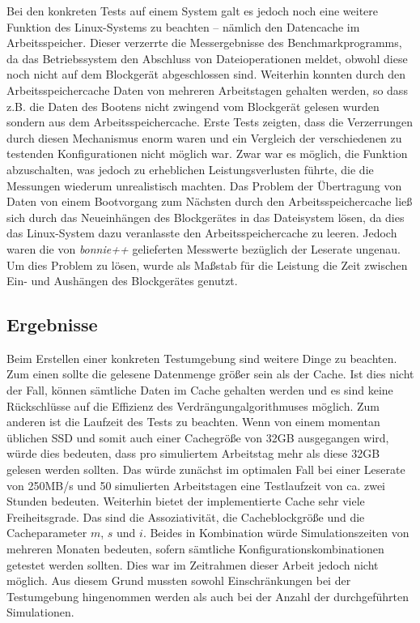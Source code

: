 Bei den konkreten Tests auf einem System galt es jedoch noch eine weitere Funktion des Linux-Systems zu beachten -- nämlich den Datencache im Arbeitsspeicher.
Dieser verzerrte die Messergebnisse des Benchmarkprogramms, da das Betriebssystem den Abschluss von Dateioperationen meldet, obwohl diese noch nicht auf dem
Blockgerät abgeschlossen sind. Weiterhin konnten durch den Arbeitsspeichercache Daten von mehreren Arbeitstagen gehalten werden, so dass z.B. die Daten des Bootens
nicht zwingend vom Blockgerät gelesen wurden sondern aus dem Arbeitsspeichercache. Erste Tests zeigten, dass die Verzerrungen durch diesen Mechanismus enorm
waren und ein Vergleich der verschiedenen zu testenden Konfigurationen nicht möglich war. Zwar war es möglich, die Funktion abzuschalten, was jedoch
zu erheblichen Leistungsverlusten führte, die die Messungen wiederum unrealistisch machten. Das Problem der Übertragung von Daten von einem Bootvorgang zum
Nächsten durch den Arbeitsspeichercache ließ sich durch das Neueinhängen des Blockgerätes in das Dateisystem lösen, da dies das Linux-System dazu veranlasste den
Arbeitsspeichercache zu leeren. Jedoch waren die von \textit{\mbox{bonnie++}} gelieferten Messwerte bezüglich der Leserate ungenau. Um dies Problem zu lösen, wurde als
Maßstab für die Leistung die Zeit zwischen Ein- und Aushängen des Blockgerätes genutzt.

\subsection{Ergebnisse}
\label{chap7:synth:results}

Beim Erstellen einer konkreten Testumgebung sind weitere Dinge zu beachten. Zum einen sollte die gelesene Datenmenge größer sein als der Cache. Ist dies nicht
der Fall, können sämtliche Daten im Cache gehalten werden und es sind keine Rückschlüsse auf die Effizienz des Verdrängungalgorithmuses möglich. Zum anderen ist
die Laufzeit des Tests zu beachten. Wenn von einem momentan üblichen \ac{SSD} und somit auch einer Cachegröße von 32GB ausgegangen wird, würde dies bedeuten,
dass pro simuliertem Arbeitstag mehr als diese 32GB gelesen werden sollten. Das würde zunächst im optimalen Fall bei einer Leserate von 250MB/s und 50
simulierten Arbeitstagen eine Testlaufzeit von ca. zwei Stunden bedeuten. Weiterhin bietet der implementierte Cache sehr viele Freiheitsgrade. Das sind die
Assoziativität, die Cacheblockgröße und die Cacheparameter $m$, $s$ und $i$. Beides in Kombination würde Simulationszeiten von mehreren Monaten bedeuten, sofern
sämtliche Konfigurationskombinationen getestet werden sollten. Dies war im Zeitrahmen dieser Arbeit jedoch nicht möglich. Aus diesem Grund mussten sowohl
Einschränkungen bei der Testumgebung hingenommen werden als auch bei der Anzahl der durchgeführten Simulationen.


